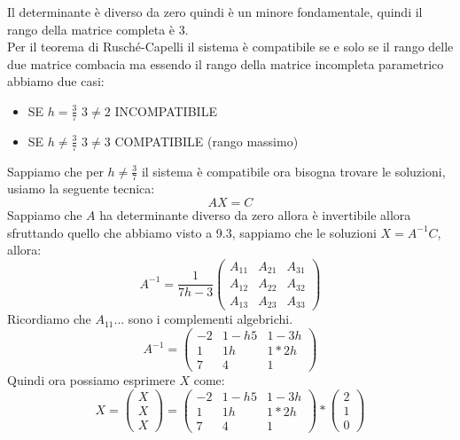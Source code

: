 Il determinante è diverso da zero quindi è un minore fondamentale, quindi il rango della matrice completa è $3$.\\
Per il teorema di Rusché-Capelli il sistema è compatibile se e solo se il rango delle due matrice combacia ma essendo il rango della matrice incompleta parametrico abbiamo due casi:
\begin{itemize}
\item[]SE $h = \frac{3}{7}$ $ 3 \neq 2 $ INCOMPATIBILE
\item[]SE $h \neq \frac{3}{7}$ $ 3 \neq 3 $ COMPATIBILE (rango massimo)
\end{itemize}
Sappiamo che per $h \neq \frac{3}{7}$ il sistema è compatibile ora bisogna trovare le soluzioni, usiamo la seguente tecnica:
$$ AX=C $$
Sappiamo che $A$ ha determinante diverso da zero allora è invertibile allora sfruttando quello che abbiamo visto a 9.3, sappiamo che le soluzioni $X=A^{-1}C$, allora:
$$ 
A^{-1} =  \frac{1}{7h-3} 
\begin{pmatrix}
A_{11} & A_{21} & A_{31} \\
A_{12} & A_{22} & A_{32} \\
A_{13} & A_{23} & A_{33}
\end{pmatrix}
$$
Ricordiamo che $A_{11}...$ sono i complementi algebrichi.
$$ 
A^{-1} =
\begin{pmatrix}
-2 & 1-h5 & 1-3h \\
1 & 1h & 1*2h \\
7 & 4 & 1
\end{pmatrix}
$$
Quindi ora possiamo esprimere $X$ come:
$$
X = \begin{pmatrix}
X \\ X \\ X
\end{pmatrix}
=
\begin{pmatrix}
-2 & 1-h5 & 1-3h \\
1 & 1h & 1*2h \\
7 & 4 & 1
\end{pmatrix}
*
\begin{pmatrix}
2 \\ 1 \\ 0
\end{pmatrix}
$$

